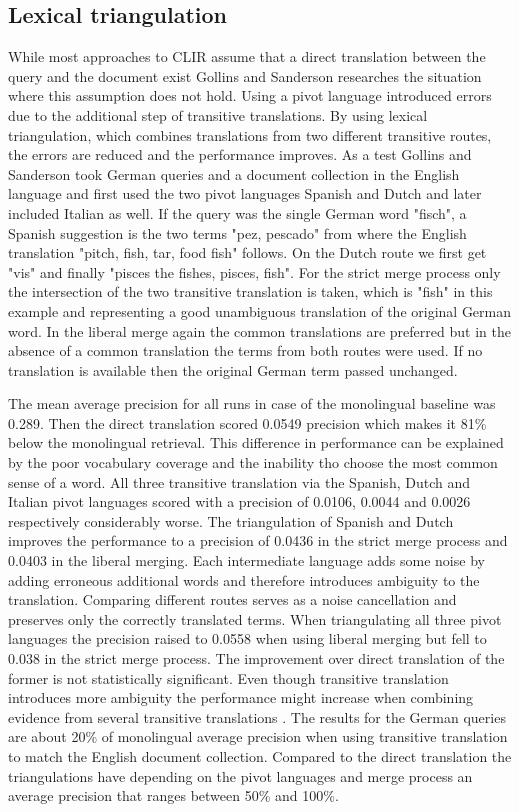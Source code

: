 \documentclass[journal]{IEEEtran}
\begin{document}
\subsection{Lexical triangulation}
While most approaches to CLIR assume that a direct translation between the query and the document exist Gollins and Sanderson \cite{gollins01} researches the situation where this assumption does not hold.
Using a pivot language introduced errors due to the additional step of transitive translations.
By using lexical triangulation, which combines translations from two different transitive routes, the errors are reduced and the performance improves.
As a test Gollins and Sanderson took German queries and a document collection in the English language and first used the two pivot languages Spanish and Dutch and later included Italian as well.
If the query was the single German word "fisch", a Spanish suggestion is the two terms "pez, pescado" from where the English translation "pitch, fish, tar, food fish" follows.
On the Dutch route we first get "vis" and finally "pisces the fishes, pisces, fish".
For the strict merge process only the intersection of the two transitive translation is taken, which is "fish" in this example and representing a good unambiguous translation of the original German word.
In the liberal merge again the common translations are preferred but in the absence of a common translation the terms from both routes were used.
If no translation is available then the original German term passed unchanged.

The mean average precision for all runs in case of the monolingual baseline was 0.289.
Then the direct translation scored 0.0549 precision which makes it 81\% below the monolingual retrieval.
This difference in performance can be explained by the poor vocabulary coverage and the inability tho choose the most common sense of a word.
All three transitive translation via the Spanish, Dutch and Italian pivot languages scored with a precision of 0.0106, 0.0044 and 0.0026 respectively considerably worse.
The triangulation of Spanish and Dutch improves the performance to a precision of 0.0436 in the strict merge process and 0.0403 in the liberal merging.
Each intermediate language adds some noise by adding erroneous additional words and therefore introduces ambiguity to the translation.
Comparing different routes serves as a noise cancellation and preserves only the correctly translated terms.
When triangulating all three pivot languages the precision raised to 0.0558 when using liberal merging but fell to 0.038 in the strict merge process.
The improvement over direct translation of the former is not statistically significant.
Even though transitive translation introduces more ambiguity the performance might increase when combining evidence from several transitive translations \cite{ballesteros00}.
The results for the German queries are about 20\% of monolingual average precision when using transitive translation to match the English document collection.
Compared to the direct translation the triangulations have depending on the pivot languages and merge process an average precision that ranges between 50\% and 100\%.
\end{document}
